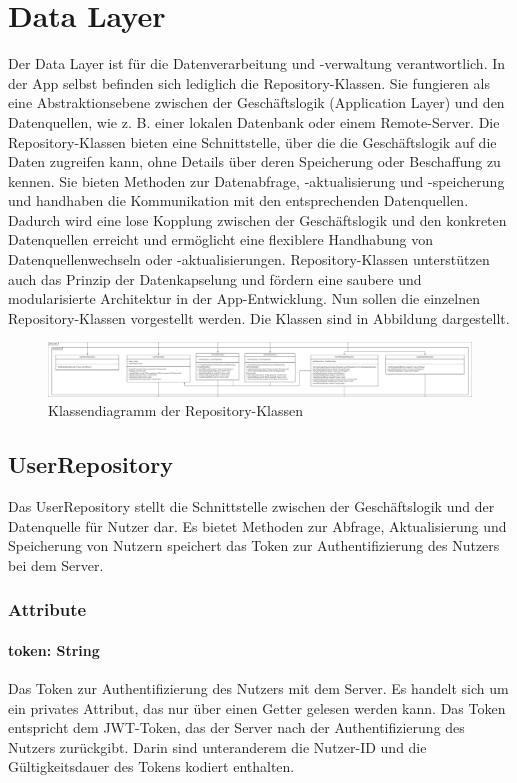 \documentclass[parskip=full]{scrartcl}
\begin{document}
\section{Data Layer}
Der Data Layer ist für die Datenverarbeitung und -verwaltung verantwortlich. In der App selbst befinden sich lediglich die Repository-Klassen. Sie fungieren als eine Abstraktionsebene zwischen der Geschäftslogik (Application Layer) und den Datenquellen, wie z. B. einer lokalen Datenbank oder einem Remote-Server. Die Repository-Klassen bieten eine Schnittstelle, über die die Geschäftslogik auf die Daten zugreifen kann, ohne Details über deren Speicherung oder Beschaffung zu kennen. Sie bieten Methoden zur Datenabfrage, -aktualisierung und -speicherung und handhaben die Kommunikation mit den entsprechenden Datenquellen. Dadurch wird eine lose Kopplung zwischen der Geschäftslogik und den konkreten Datenquellen erreicht und ermöglicht eine flexiblere Handhabung von Datenquellenwechseln oder -aktualisierungen. Repository-Klassen unterstützen auch das Prinzip der Datenkapselung und fördern eine saubere und modularisierte Architektur in der App-Entwicklung.
Nun sollen die einzelnen Repository-Klassen vorgestellt werden. Die Klassen sind in Abbildung  dargestellt.
\begin{figure}[htp]
    \centering
    \includegraphics[width=\textwidth]{images/dataLayer/dataLayer.pdf}
    \caption{Klassendiagramm der Repository-Klassen}
    \label{fig:dataLayer}
\end{figure}
\newpage
\subsection{UserRepository}
Das UserRepository stellt die Schnittstelle zwischen der Geschäftslogik und der Datenquelle für Nutzer dar. Es bietet Methoden zur Abfrage, Aktualisierung und Speicherung von Nutzern speichert das Token zur Authentifizierung des Nutzers bei dem Server.
\subsubsection*{Attribute}
\paragraph{token: String}
Das Token zur Authentifizierung des Nutzers mit dem Server. Es handelt sich um ein privates Attribut, das nur über einen Getter gelesen werden kann. Das Token entspricht dem JWT-Token, das der Server nach der Authentifizierung des Nutzers zurückgibt. Darin sind unteranderem die Nutzer-ID und die Gültigkeitsdauer des Tokens kodiert enthalten.
\end{document}

